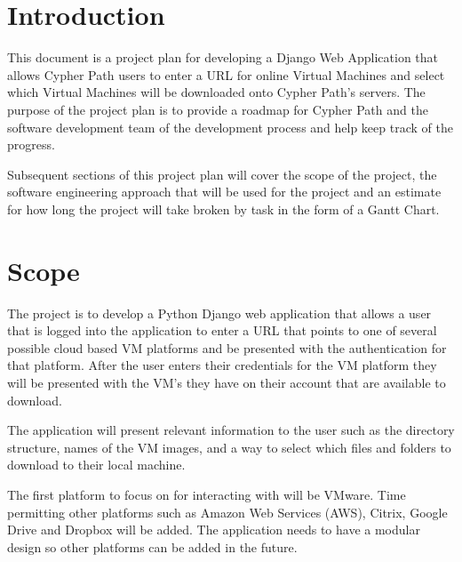 \documentclass{article}
\title{}
\author{}
\date{}
\begin{document}
    

    \tableofcontents
    \listoffigures

    \newpage
    \begin{versionhistory}
    \end{versionhistory}
    \newpage


    \section{Introduction}
    This document is a project plan for developing a Django Web Application that allows Cypher Path users to enter
    a URL for online Virtual Machines and select which Virtual Machines will be downloaded onto Cypher Path's 
    servers. The purpose of the project plan is to provide a roadmap for Cypher Path and the software development
    team of the development process and help keep track of the progress.

    Subsequent sections of this project plan will cover the scope of the project, the software engineering
    approach that will be used for the project and an estimate for how long the project will take broken by task
    in the form of a Gantt Chart.

    \section{Scope}
    The project is to develop a Python Django web application that allows a user that is logged into the application to enter a URL that points to one of several
    possible cloud based VM platforms and be presented with the authentication for that platform. After the user enters their credentials for the VM platform 
    they will be presented with the VM's they have on their account that are available to download.
    
    The application will present relevant information to the user such as the directory structure, names of the VM images, and a way to select which files and folders
    to download to their local machine.

    The first platform to focus on for interacting with will be VMware. Time permitting other platforms such as Amazon Web Services (AWS), Citrix, Google Drive and Dropbox
    will be added. The application needs to have a modular design so other platforms can be added in the future.
\end{document}
